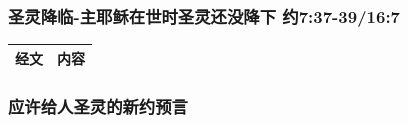 \subsubsection{圣灵降临-主耶稣在世时圣灵还没降下 约7:37-39/16:7}
\begin{table}[H]
\centering
\begin{tabular}{p{6em}|p{40em}}  \toprule
经文&内容\\  \midrule

\end{tabular}
\end{table}


\subsubsection{应许给人圣灵的新约预言}
